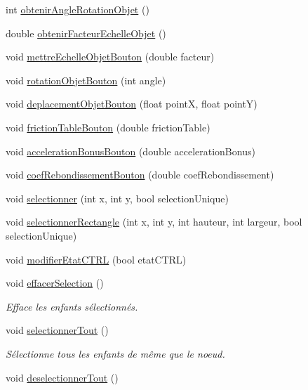\begin{DoxyCompactItemize}
int \hyperlink{group__inf2990_ga23433e7ffee476584b4744e788e852cd}{obtenir\+Angle\+Rotation\+Objet} ()
\item 
double \hyperlink{group__inf2990_ga57c0c4ae3a71280a05382ff4d5e12e54}{obtenir\+Facteur\+Echelle\+Objet} ()
\item 
void \hyperlink{group__inf2990_ga4800fc8f01068272efcd95566afcf6d0}{mettre\+Echelle\+Objet\+Bouton} (double facteur)
\item 
void \hyperlink{group__inf2990_ga3b73f7b713b8a145864d4fe9a14364fb}{rotation\+Objet\+Bouton} (int angle)
\item 
void \hyperlink{group__inf2990_ga747d92f0e95625f5efd1e0ea6c0d7335}{deplacement\+Objet\+Bouton} (float pointX, float pointY)
\item 
void \hyperlink{group__inf2990_ga9bf185e12bfee5ee7578510184a982bd}{friction\+Table\+Bouton} (double friction\+Table)
\item 
void \hyperlink{group__inf2990_ga25fbe237c5982b3d1cacc1c83473dae5}{acceleration\+Bonus\+Bouton} (double acceleration\+Bonus)
\item 
void \hyperlink{group__inf2990_ga6f6a68a9d911937984a82e2695833f6b}{coef\+Rebondissement\+Bouton} (double coef\+Rebondissement)
\item 
void \hyperlink{group__inf2990_gab7f0c394d8d0146df2d650fa4bacfa0c}{selectionner} (int x, int y, bool selection\+Unique)
\item 
void \hyperlink{group__inf2990_gadd21511d1467ade48b9cd03ea6e2519d}{selectionner\+Rectangle} (int x, int y, int hauteur, int largeur, bool selection\+Unique)
\item 
void \hyperlink{group__inf2990_gac902d1469506a0bff2f1ef4e7807ded1}{modifier\+Etat\+C\+T\+RL} (bool etat\+C\+T\+RL)
\item 
void \hyperlink{group__inf2990_ga69c996f033b587e631ad3c620002ed98}{effacer\+Selection} ()
\begin{DoxyCompactList}\small\item\em Efface les enfants sélectionnés. \end{DoxyCompactList}\item 
void \hyperlink{group__inf2990_ga6741b9a8e4d6e0b3405543e999709350}{selectionner\+Tout} ()
\begin{DoxyCompactList}\small\item\em Sélectionne tous les enfants de même que le noeud. \end{DoxyCompactList}\item 
void \hyperlink{group__inf2990_ga620c6ede44e1bfec76fe10d5e8477a2a}{deselectionner\+Tout} ()

\end{DoxyCompactItemize}
